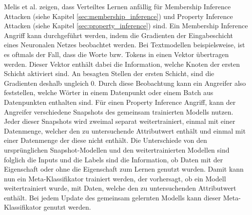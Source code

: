 Melis et al. \cite{P-82} zeigen, dass Verteiltes Lernen anfällig für Membership Inference Attacken (siehe Kapitel \ref{sec:membership_inference}) und Property Inference Attacken (siehe Kapitel \ref{sec:property_inference}) sind.
Ein Membership Inference Angriff kann durchgeführt werden, indem die Gradienten der Eingabeschicht eines Neuronalen Netzes beobachtet werden. 
Bei Textmodellen beispielsweise, ist es oftmals der Fall, dass die Worte bzw. Tokens in einen Vektor übertragen werden. 
Dieser Vektor enthält dabei die Information, welche Knoten der ersten Schicht aktiviert sind. 
An besagten Stellen der ersten Schicht, sind die Gradienten deshalb ungleich 0.
Durch diese Beobachtung kann ein Angreifer also feststellen, welche Wörter in einem Datenpunkt oder einem Batch aus Datenpunkten enthalten sind.
Für einen Property Inference Angriff, kann der Angreifer verschiedene Snapshots des gemeinsam trainierten Modells nutzen. 
Jeder dieser Snapshots wird zweimal separat weitertrainiert, einmal mit einer Datenmenge, welcher den zu untersuchende Attributwert enthält und einmal mit einer Datenmenge der diese nicht enthält.
Die Unterschiede von den ursprünglichen Snapshot-Modellen und den weitertrainierten Modellen sind folglich die Inputs und die Labels sind die Information, ob Daten mit der Eigenschaft oder ohne die Eigenschaft zum Lernen genutzt wurden.
Damit kann nun ein Meta-Klassifikator trainiert werden, der vorhersagt, ob ein Modell weitertrainiert wurde, mit Daten, welche den zu untersuchenden Attributwert enthält.
Bei jedem Update des gemeinsam gelernten Modells kann dieser Meta-Klassifikator genutzt werden.


